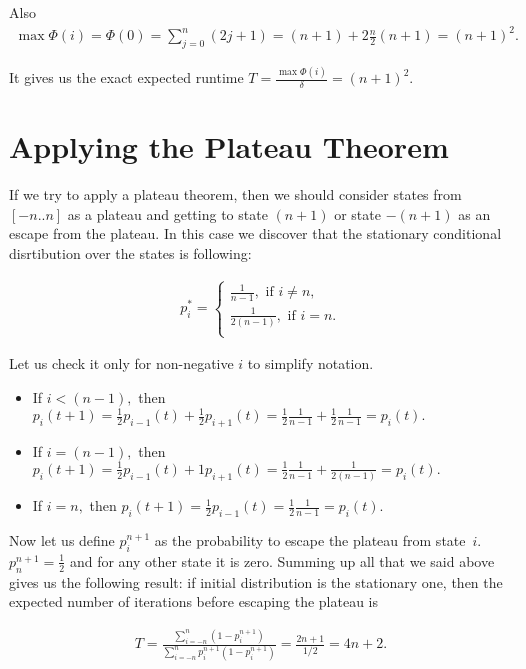 \documentclass{article}
\begin{document}
Also
\begin{align*}
  \max \Phi(i) = \Phi(0) = \sum\limits_{j = 0}^n (2j + 1) = (n + 1) + 2 \frac{n}{2} (n + 1) = (n + 1)^2.
\end{align*}

It gives us the exact expected runtime $T = \frac{\max\Phi(i)}{\delta} = (n + 1)^2.$

\section{Applying the Plateau Theorem}

If we try to apply a plateau theorem, then we should consider states from $[-n..n]$ as a plateau and getting to state $(n + 1)$ or state $-(n + 1)$ as an escape from the plateau. In this case we discover that the stationary conditional disrtibution over the states is following:

\begin{align*}
  p_i^* =
  \begin{cases}
    \frac{1}{n - 1}, \text{ if } i \ne n, \\
    \frac{1}{2(n - 1)}, \text{ if } i = n. \\
  \end{cases}
\end{align*}

Let us check it only for non-negative $i$ to simplify notation.
\begin{itemize}
  \item If $i < (n - 1),$ then $p_i(t + 1) = \frac{1}{2} p_{i - 1}(t) + \frac{1}{2} p_{i + 1}(t) = \frac{1}{2}\frac{1}{n - 1} + \frac{1}{2}\frac{1}{n - 1} = p_i(t).$
  \item If $i = (n - 1),$ then $p_i(t + 1) = \frac{1}{2} p_{i - 1}(t) + 1 p_{i + 1}(t) = \frac{1}{2}\frac{1}{n - 1} + \frac{1}{2(n - 1)} = p_i(t).$
  \item If $i = n,$ then $p_i(t + 1) = \frac{1}{2} p_{i - 1}(t)= \frac{1}{2}\frac{1}{n - 1} = p_i(t).$
\end{itemize}

Now let us define $p_i^{n + 1}$ as the probability to escape the plateau from state~$i$. $p_n^{n + 1} = \frac{1}{2}$ and for any other state it is zero. Summing up all that we said above gives us the following result: if initial distribution is the stationary one, then the expected number of iterations before escaping the plateau is

\begin{align*}
  T = \frac{\sum\limits_{i = -n}^n (1 - p_i^{n + 1})}{\sum\limits_{i = -n}^n p_i^{n + 1}(1 - p_i^{n + 1})} = \frac{2n + 1}{1/2} = 4n + 2.
\end{align*}
\end{document}
